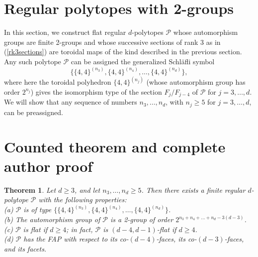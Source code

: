 \documentclass[10pt,a4paper]{amsart}
\newtheorem{theorem}{Theorem}[section]
\theoremstyle{definition}
\begin{document}
\section{Regular polytopes with 2-groups}
\label{regpols2}
\medskip

In this section, we construct flat regular $d$-polytopes $\mathcal P$ whose automorphism groups are finite 2-groups and whose successive sections of rank 3 as in (\ref{rk3sections}) are toroidal maps of the kind described in the previous section. Any such polytope $\mathcal P$ can be assigned the generalized Schl\"afli symbol
\begin{equation}
\label{all4stypes}
\{\{4,4\}^{(n_3)},\{4,4\}^{(n_4)},\ldots,\{4,4\}^{(n_{d})}\},
\end{equation}
where here the toroidal polyhedron $\{4,4\}^{(n_j)}$ (whose automorphism group has order $2^{n_j}$) gives the isomorphism type of the section 
$F_{j}/F_{j-4}$ of $\mathcal P$ for $j=3,\ldots,d$.  We will show that any sequence of numbers $n_3,\ldots,n_d$, with $n_{j}\geq 5$ for $j=3,\ldots,d$, can be preassigned. 

\section{Counted theorem and complete author proof}
\begin{theorem}
\label{flat44thm}
Let $d\geq 3$, and let $n_3,\ldots,n_d\geq 5$. Then there exists a finite regular $d$-polytope $\mathcal P$ with the following properties:\\[.02in]
(a) $\mathcal P$ is of type $\{\{4,4\}^{(n_3)},\{4,4\}^{(n_4)},\ldots,\{4,4\}^{(n_{d})}\}$.\\[.02in]
(b) The automorphism group of $\mathcal P$ is a 2-group of order 
$2^{n_3+n_4+\ldots+n_d - 3(d-3)}$.\\[.02in]
(c) $\mathcal P$ is flat if $d\geq 4$; in fact, $\mathcal P$ is $(d-4,d-1)$-flat if $d\geq 4$.\\[.02in]
(d) $\mathcal P$ has the FAP with respect to its co-$(d-4)$-faces, its co-$(d-3)$-faces, and its facets.
\end{theorem}
\end{document}
